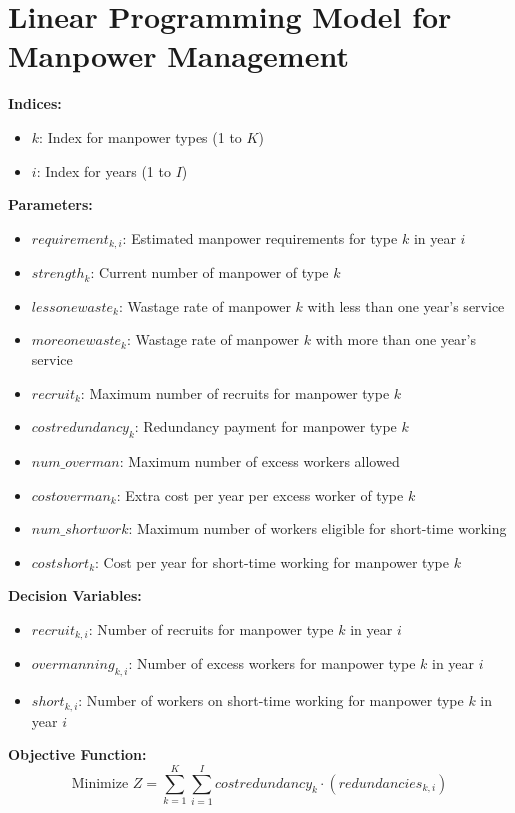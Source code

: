 \documentclass{article}
\begin{document}
\section*{Linear Programming Model for Manpower Management}

\textbf{Indices:}
\begin{itemize}
    \item $k$: Index for manpower types (1 to $K$)
    \item $i$: Index for years (1 to $I$)
\end{itemize}

\textbf{Parameters:}
\begin{itemize}
    \item $requirement_{k,i}$: Estimated manpower requirements for type $k$ in year $i$
    \item $strength_{k}$: Current number of manpower of type $k$
    \item $lessonewaste_{k}$: Wastage rate of manpower $k$ with less than one year's service
    \item $moreonewaste_{k}$: Wastage rate of manpower $k$ with more than one year's service
    \item $recruit_{k}$: Maximum number of recruits for manpower type $k$
    \item $costredundancy_{k}$: Redundancy payment for manpower type $k$
    \item $num\_overman$: Maximum number of excess workers allowed
    \item $costoverman_{k}$: Extra cost per year per excess worker of type $k$
    \item $num\_shortwork$: Maximum number of workers eligible for short-time working
    \item $costshort_{k}$: Cost per year for short-time working for manpower type $k$
\end{itemize}

\textbf{Decision Variables:}
\begin{itemize}
    \item $recruit_{k,i}$: Number of recruits for manpower type $k$ in year $i$
    \item $overmanning_{k,i}$: Number of excess workers for manpower type $k$ in year $i$
    \item $short_{k,i}$: Number of workers on short-time working for manpower type $k$ in year $i$
\end{itemize}

\textbf{Objective Function:}
\[
\text{Minimize } Z = \sum_{k=1}^{K} \sum_{i=1}^{I} costredundancy_{k} \cdot (redundancies_{k,i})
\]
\end{document}
